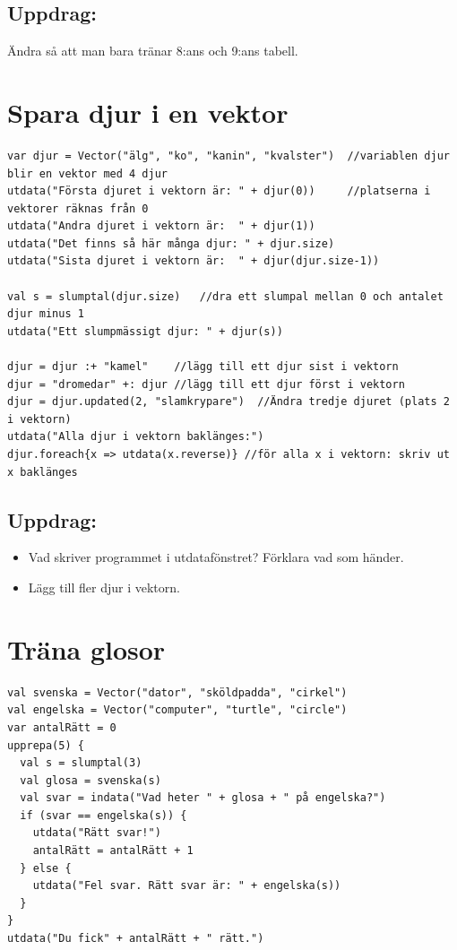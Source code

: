 \section*{\color{BrickRed}Uppdrag:}
Ändra så att man bara tränar 8:ans och 9:ans tabell.
\chapter{Spara djur i en vektor}
\begin{lstlisting}[basicstyle={\ttfamily\fontsize{16}{19}\selectfont},numbers=none]
var djur = Vector("älg", "ko", "kanin", "kvalster")  //variablen djur blir en vektor med 4 djur
utdata("Första djuret i vektorn är: " + djur(0))     //platserna i vektorer räknas från 0
utdata("Andra djuret i vektorn är:  " + djur(1))
utdata("Det finns så här många djur: " + djur.size)
utdata("Sista djuret i vektorn är:  " + djur(djur.size-1))

val s = slumptal(djur.size)   //dra ett slumpal mellan 0 och antalet djur minus 1
utdata("Ett slumpmässigt djur: " + djur(s))

djur = djur :+ "kamel"    //lägg till ett djur sist i vektorn
djur = "dromedar" +: djur //lägg till ett djur först i vektorn
djur = djur.updated(2, "slamkrypare")  //Ändra tredje djuret (plats 2 i vektorn)
utdata("Alla djur i vektorn baklänges:")
djur.foreach{x => utdata(x.reverse)} //för alla x i vektorn: skriv ut x baklänges
\end{lstlisting}
        
\section*{\color{BrickRed}Uppdrag:}


\begin{itemize}

\item {Vad skriver programmet i utdatafönstret? Förklara vad som händer.}
\item {Lägg till fler djur i vektorn.}

\end{itemize}


\chapter{Träna glosor}
\begin{lstlisting}[basicstyle={\ttfamily\fontsize{16}{19}\selectfont},numbers=none]
val svenska = Vector("dator", "sköldpadda", "cirkel")
val engelska = Vector("computer", "turtle", "circle")
var antalRätt = 0
upprepa(5) {
  val s = slumptal(3)
  val glosa = svenska(s)
  val svar = indata("Vad heter " + glosa + " på engelska?")
  if (svar == engelska(s)) {
    utdata("Rätt svar!")
    antalRätt = antalRätt + 1
  } else {
    utdata("Fel svar. Rätt svar är: " + engelska(s))
  }
}
utdata("Du fick" + antalRätt + " rätt.")
\end{lstlisting}
        
